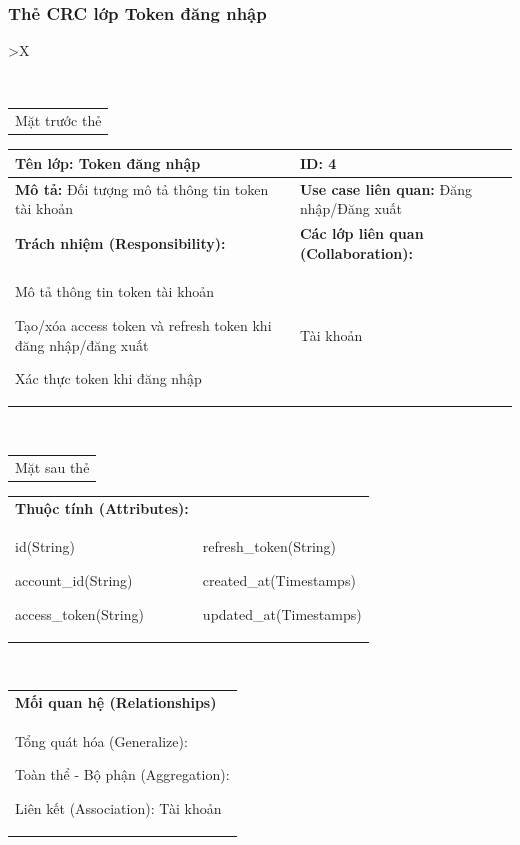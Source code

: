 \subsubsection{Thẻ CRC lớp Token đăng nhập}
  \begin{xltabular}{\textwidth}{
    >{\centering\arraybackslash}X 
  }
  \caption{\bfseries \fontsize{12pt}{0pt}\selectfont Thẻ CRC lớp Token đăng nhập}
  \\
  \begin{tabularx}{0.9\textwidth}{X}
    Mặt trước thẻ
  \end{tabularx}
  \begin{tabularx}{0.9\textwidth}{|X|X|}
    \hline
    \textbf{Tên lớp:} Token đăng nhập & \textbf{ID:} 4  \\
    \hline
    \textbf{Mô tả:} Đối tượng mô tả thông tin token tài khoản & \textbf{Use case liên quan:} Đăng nhập/Đăng xuất \\
    \hline
    \textbf{Trách nhiệm (Responsibility):} & \textbf{Các lớp liên quan (Collaboration):} \\
    Mô tả thông tin token tài khoản

    Tạo/xóa access token và refresh token khi đăng nhập/đăng xuất

    Xác thực token khi đăng nhập
    & 
    Tài khoản
    \\
    \hline
  \end{tabularx}
  \\
  \begin{tabularx}{0.9\textwidth}{X}
    Mặt sau thẻ
  \end{tabularx} 
  \begin{tabularx}{0.9\textwidth}{|X|X|}
    \hline
    \textbf{Thuộc tính (Attributes):} & \\
    id(String) 
    
    account\_id(String)

    access\_token(String)
    & 
    refresh\_token(String) 
          
    created\_at(Timestamps)

    updated\_at(Timestamps)
    \\
    \hline
  \end{tabularx}
  \\     
  \begin{tabularx}{0.9\textwidth}{|X|}
    \textbf{Mối quan hệ (Relationships)} \\
    Tổng quát hóa (Generalize):

    Toàn thể - Bộ phận (Aggregation):
      
    Liên kết (Association): Tài khoản
    \\
    \hline
  \end{tabularx}
  \end{xltabular}

